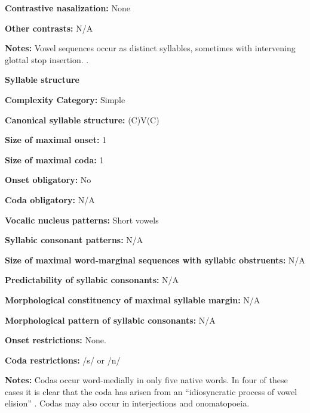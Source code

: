 \textbf{Contrastive nasalization:} None



\textbf{Other contrasts:} N/A



\textbf{Notes:} Vowel sequences occur as distinct syllables, sometimes with intervening glottal stop insertion. \citep[28-9]{Guillaume2008}.



\textbf{Syllable structure}



\textbf{Complexity Category:} Simple



\textbf{Canonical syllable structure:} (C)V(C) \citep[30-32]{Guillaume2008}



\textbf{Size of maximal onset:} 1



\textbf{Size of maximal coda:} 1



\textbf{Onset obligatory:} No



\textbf{Coda obligatory:} N/A



\textbf{Vocalic nucleus patterns:} Short vowels



\textbf{Syllabic consonant patterns:} N/A



\textbf{Size of maximal word{}-marginal sequences with syllabic obstruents:} N/A



\textbf{Predictability of syllabic consonants:} N/A



\textbf{Morphological constituency of maximal syllable margin:} N/A



\textbf{Morphological pattern of syllabic consonants:} N/A



\textbf{Onset restrictions:} None.



\textbf{Coda restrictions:} /s/ or /n/



\textbf{Notes:} Codas occur word-medially in only five native words. In four of these cases it is clear that the coda has arisen from an “idiosyncratic process of vowel elision” \citep[31]{Guillaume2008}. Codas may also occur in interjections and onomatopoeia.



